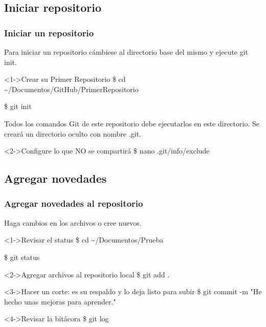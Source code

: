 \subsection{Iniciar repositorio}
\begin{frame}
  \frametitle{Iniciar un repositorio}
  Para iniciar un repositorio cámbiese al directorio base del mismo y ejecute git init.
  \begin{block}<1->{Crear su Primer Repositorio}
    \$ cd \textasciitilde/Documentos/GitHub/PrimerRepositorio\par
    \$ git init
  \end{block}
  Todos los comandos Git de este repositorio debe ejecutarlos en este directorio. Se creará un directorio oculto con nombre .git.
  \begin{block}<2->{Configure lo que NO se compartirá}
    \$ nano .git/info/exclude
  \end{block}
\end{frame}

\subsection{Agregar novedades}
\begin{frame}
  \frametitle{Agregar novedades al repositorio}
  Haga cambios en los archivos o cree nuevos.
  \begin{block}<1->{Revisar el status}
    \$ cd \textasciitilde/Documentos/Prueba\par
    \$ git status
  \end{block}
  \begin{block}<2->{Agregar archivos al repositorio local}
    \$ git add .
  \end{block}
  \begin{block}<3->{Hacer un corte: es su respaldo y lo deja listo para subir}
    \$ git commit -m "He hecho unas mejoras para aprender."
  \end{block}
  \begin{block}<4->{Revisar la bitácora}
    \$ git log
  \end{block}
\end{frame}

